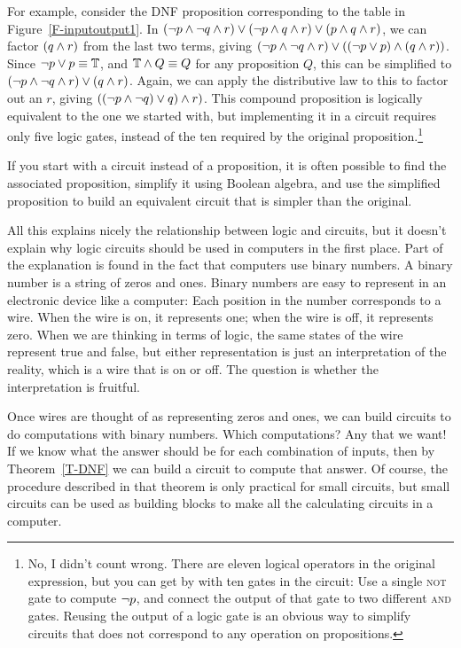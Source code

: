 For example, consider the DNF proposition corresponding to the
table in Figure~\ref{F-inputoutput1}.  In $(\lnot p\wedge\lnot q\wedge r) \vee
(\lnot p\wedge q\wedge r) \vee (p\wedge q\wedge r)$, we can factor $(q\wedge r)$
from the last two terms, giving $(\lnot p\wedge\lnot q\wedge r) \vee
((\lnot p\vee p) \wedge (q\wedge r))$.  Since $\lnot p\vee p\equiv\mathbb{T}$,
and $\mathbb{T}\wedge Q\equiv Q$ for any proposition $Q$,
this can be simplified to $(\lnot p\wedge\lnot q\wedge r) \vee (q\wedge r)$.
Again, we can apply the distributive law to this to factor
out an $r$, giving $((\lnot p\wedge \lnot q)\vee q)\wedge r)$.
This compound proposition is logically equivalent to the one we
started with, but implementing it in a circuit
requires only five logic gates, instead of the
ten required by the original proposition.\footnote{No, I didn't
count wrong.  There are eleven logical operators in the original
expression, but you can get by with ten gates in the circuit:
Use a single \textsc{not} gate to compute $\lnot p$, and connect
the output of that gate to two different \textsc{and} gates.
Reusing the output of a logic gate is an obvious way to simplify
circuits that does not correspond to any operation on propositions.}

If you start with a circuit instead of a proposition, it is
often possible to find the associated proposition, simplify it
using Boolean algebra, and use the simplified proposition to
build an equivalent circuit that is simpler than the original.


\medbreak

All this explains nicely the relationship between logic
and circuits, but it doesn't explain why logic circuits
should be used in computers in the first place.  Part of
the explanation is found in the fact that computers use binary
numbers.  A binary number is a string of zeros and ones.
Binary numbers are easy to represent in an electronic device
like a computer:  Each position in the number corresponds to
a wire. When the wire is on, it represents one; when the
wire is off, it represents zero.  When we are thinking in terms
of logic, the same states of the wire represent true and false,
but either representation is just an interpretation of the
reality, which is a wire that is on or off.  The question is
whether the interpretation is fruitful.

Once wires are thought of as representing zeros and ones,
we can build circuits to do computations with binary numbers.
Which computations?  Any that we want!  If we know
what the answer should be for each combination of inputs,
then by Theorem~\ref{T-DNF} we can build a circuit to compute
that answer.  Of course, the procedure described in that 
theorem is only practical for small circuits, but small
circuits can be used as building blocks to make all the
calculating circuits in a computer.


